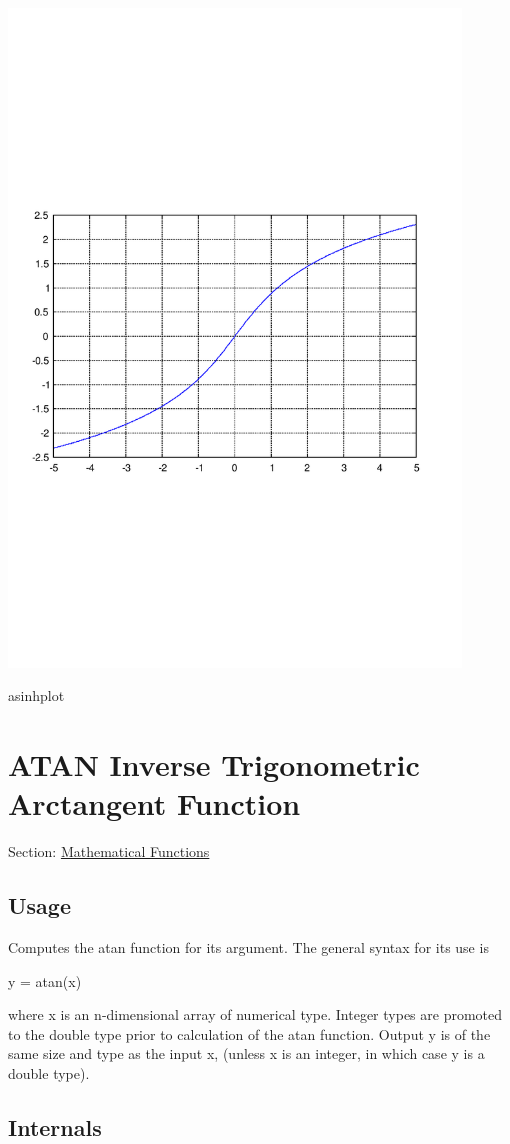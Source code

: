  
\begin{DoxyImage}
\includegraphics[width=12cm]{asinhplot}
\caption{asinhplot}
\end{DoxyImage}
 \hypertarget{mathfunctions_atan}{}\section{A\-T\-A\-N Inverse Trigonometric Arctangent Function}\label{mathfunctions_atan}
Section\-: \hyperlink{sec_mathfunctions}{Mathematical Functions} \hypertarget{vtkwidgets_vtkxyplotwidget_Usage}{}\subsection{Usage}\label{vtkwidgets_vtkxyplotwidget_Usage}
Computes the {\ttfamily atan} function for its argument. The general syntax for its use is \begin{DoxyVerb}  y = atan(x)
\end{DoxyVerb}
 where {\ttfamily x} is an {\ttfamily n}-\/dimensional array of numerical type. Integer types are promoted to the {\ttfamily double} type prior to calculation of the {\ttfamily atan} function. Output {\ttfamily y} is of the same size and type as the input {\ttfamily x}, (unless {\ttfamily x} is an integer, in which case {\ttfamily y} is a {\ttfamily double} type). \hypertarget{transforms_svd_Function}{}\subsection{Internals}\label{transforms_svd_Function}
